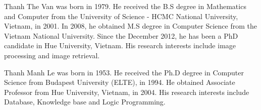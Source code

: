 \documentclass{amcs}
\begin{document}


\begin{biography}[H1.eps]{Thanh The Van} was born in 1979. He received the B.S degree in Mathematics and Computer from the University of Science - HCMC National University, Vietnam, in 2001. In 2008, he obtained M.S degree in Computer Science from the Vietnam National University. Since the December 2012, he has been a PhD candidate in Hue University, Vietnam. His research interests include image processing and image retrieval.
\end{biography}

\begin{biography}[H2.eps]{Thanh Manh Le} was born in 1953. He received the Ph.D degree in Computer Science from Budapest University (ELTE), in 1994. He obtained Associate Professor from Hue University, Vietnam, in 2004. His research interests include Database, Knowledge base and Logic Programming.
\end{biography}


\end{document}
